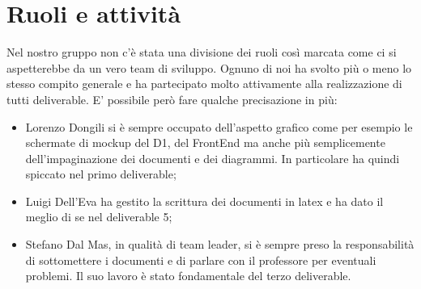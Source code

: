 \section{Ruoli e attività}
Nel nostro gruppo non c'è stata una divisione dei ruoli così marcata come ci si aspetterebbe da un vero team di sviluppo.
Ognuno di noi ha svolto più o meno lo stesso compito generale e ha partecipato molto attivamente alla realizzazione di tutti deliverable. E' possibile però fare qualche precisazione in più:
\begin{itemize}
\item Lorenzo Dongili si è sempre occupato dell'aspetto grafico come per esempio le schermate di mockup del D1, del FrontEnd ma anche più semplicemente dell'impaginazione dei documenti e dei diagrammi. In particolare ha quindi spiccato nel primo deliverable;
\item Luigi Dell'Eva ha gestito la scrittura dei documenti in latex e ha dato il meglio di se nel deliverable 5;
\item Stefano Dal Mas, in qualità di team leader, si è sempre preso la responsabilità di sottomettere i documenti e di parlare con il professore per eventuali problemi. Il suo lavoro è stato fondamentale del terzo deliverable.
\end{itemize}



